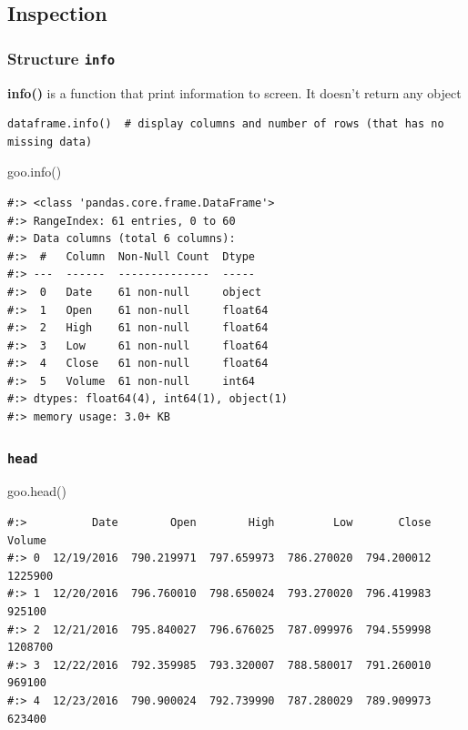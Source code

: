 \documentclass[
]{book}
\newenvironment{Shaded}{\begin{snugshade}}{\end{snugshade}}
\newcommand{\NormalTok}[1]{#1}
\begin{document}
\hypertarget{inspection}{%
\subsection{Inspection}\label{inspection}}

\hypertarget{structure-info}{%
\subsubsection{\texorpdfstring{Structure \texttt{info}}{Structure info}}\label{structure-info}}

\textbf{info()} is a function that print information to screen. It doesn't return any object

\begin{verbatim}
dataframe.info()  # display columns and number of rows (that has no missing data)
\end{verbatim}

\begin{Shaded}
\begin{Highlighting}[]
\NormalTok{goo.info()}
\end{Highlighting}
\end{Shaded}

\begin{verbatim}
#:> <class 'pandas.core.frame.DataFrame'>
#:> RangeIndex: 61 entries, 0 to 60
#:> Data columns (total 6 columns):
#:>  #   Column  Non-Null Count  Dtype  
#:> ---  ------  --------------  -----  
#:>  0   Date    61 non-null     object 
#:>  1   Open    61 non-null     float64
#:>  2   High    61 non-null     float64
#:>  3   Low     61 non-null     float64
#:>  4   Close   61 non-null     float64
#:>  5   Volume  61 non-null     int64  
#:> dtypes: float64(4), int64(1), object(1)
#:> memory usage: 3.0+ KB
\end{verbatim}

\hypertarget{head}{%
\subsubsection{\texorpdfstring{\texttt{head}}{head}}\label{head}}

\begin{Shaded}
\begin{Highlighting}[]
\NormalTok{goo.head()}
\end{Highlighting}
\end{Shaded}

\begin{verbatim}
#:>          Date        Open        High         Low       Close   Volume
#:> 0  12/19/2016  790.219971  797.659973  786.270020  794.200012  1225900
#:> 1  12/20/2016  796.760010  798.650024  793.270020  796.419983   925100
#:> 2  12/21/2016  795.840027  796.676025  787.099976  794.559998  1208700
#:> 3  12/22/2016  792.359985  793.320007  788.580017  791.260010   969100
#:> 4  12/23/2016  790.900024  792.739990  787.280029  789.909973   623400
\end{verbatim}
\end{document}
